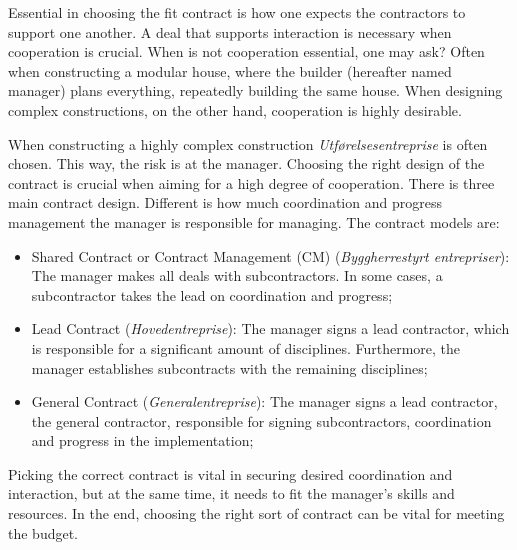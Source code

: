 Essential in choosing the fit contract is how one expects the contractors to support one another. A deal that supports interaction is necessary when cooperation is crucial. When is not cooperation essential, one may ask? Often when constructing a modular house, where the builder (hereafter named manager) plans everything, repeatedly building the same house. When designing complex constructions, on the other hand, cooperation is highly desirable. 

When constructing a highly complex construction \textit{Utførelsesentreprise} is often chosen. This way, the risk is at the manager. Choosing the right design of the contract is crucial when aiming for a high degree of cooperation. There is three main contract design. Different is how much coordination and progress management the manager is responsible for managing. The contract models are: 

\begin{itemize}
    \item Shared Contract or Contract Management (CM) (\textit{Byggherrestyrt entrepriser}): The manager makes all deals with subcontractors. In some cases, a subcontractor takes the lead on coordination and progress;
    \item Lead Contract (\textit{Hovedentreprise}): The manager signs a lead contractor, which is responsible for a significant amount of disciplines. Furthermore, the manager establishes subcontracts with the remaining disciplines; 
    \item General Contract (\textit{Generalentreprise}): The manager signs a lead contractor, the general contractor, responsible for signing subcontractors, coordination and progress in the implementation;
\end{itemize}

Picking the correct contract is vital in securing desired coordination and interaction, but at the same time, it needs to fit the manager's skills and resources. In the end, choosing the right sort of contract can be vital for meeting the budget.


\cleardoublepage